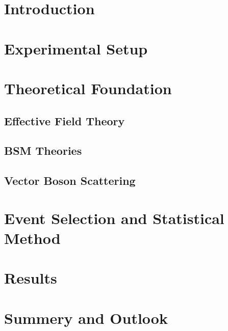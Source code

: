 \tableofcontents
\printnoidxglossary[type=acronym]
\printacronyms

\chapter{Introduction}


\chapter{Experimental Setup}


\chapter{Theoretical Foundation}
\label{chapter:Theory}
\section{Effective Field Theory}


\section{BSM Theories}

\newpage

\section{Vector Boson Scattering}


\chapter{Event Selection and Statistical Method}
\label{chapter:Event_and_stat}


\chapter{Results}


\chapter{Summery and Outlook}



\newpage
\nocite{*}
\printbibliography

\listoffigures
\listoftables

